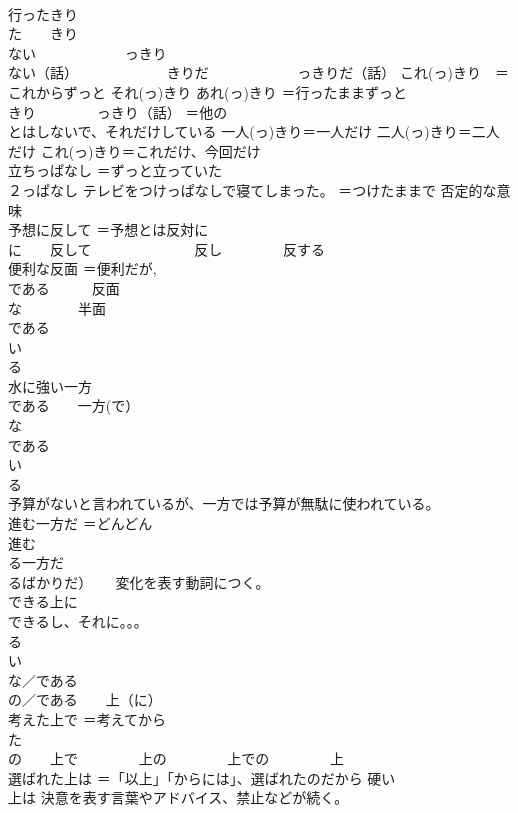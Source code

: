 \documentclass[8pt]{extreport}
\begin{document}
\begin{CJK}{UTF8}{min}
\\	行ったきり	
\\	た　　きり
\\	ない 　　　　　　っきり
\\	ない（話） 　　　　　　きりだ 　　　　　　っきりだ（話） これ(っ)きり　＝これからずっと それ(っ)きり あれ(っ)きり ＝行ったままずっと 
\\	きり 　　　　っきり（話） ＝他の
\\	とはしないで、それだけしている 一人(っ)きり＝一人だけ 二人(っ)きり＝二人だけ これ(っ)きり＝これだけ、今回だけ
\\	立ちっぱなし	＝ずっと立っていた 
\\	２っぱなし テレビをつけっぱなしで寝てしまった。 ＝つけたままで 否定的な意味
\\	予想に反して	＝予想とは反対に 
\\	に　　反して　　　 　　　　反し 　　　　反する
\\	便利な反面	＝便利だが, 
\\	である　　　反面 
\\	な　　　　半面 
\\	である 
\\	い 
\\	る
\\	水に強い一方	
\\	である　　一方(で） 
\\	な 
\\	である 
\\	い 
\\	る 
\\	予算がないと言われているが、一方では予算が無駄に使われている。 
\\	進む一方だ	＝どんどん
\\	進む 
\\	る一方だ 
\\	るばかりだ） 　 変化を表す動詞につく。
\\	できる上に	
\\	できるし、それに。。。 
\\	る 
\\	い 
\\	な／である 
\\	の／である　　上（に）
\\	考えた上で	＝考えてから 
\\	た 
\\	の　　上で 　　　　上の 　　　　上での 　　　　上
\\	選ばれた上は	＝「以上」「からには」、選ばれたのだから 硬い 
\\	上は 決意を表す言葉やアドバイス、禁止などが続く。

\end{CJK}
\end{document}
